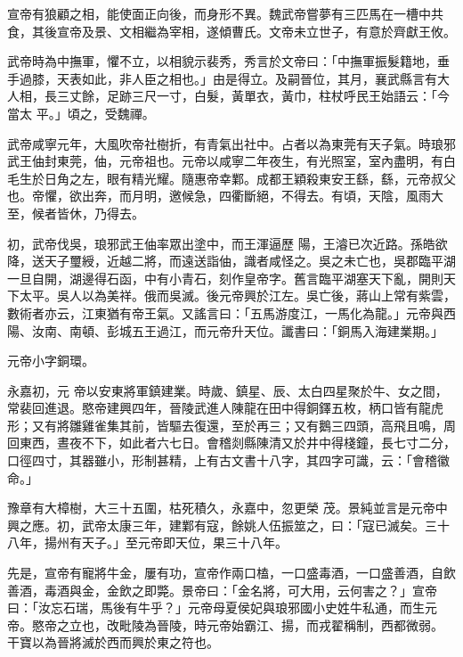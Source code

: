 \begin{pinyinscope}
 宣帝有狼顧之相，能使面正向後，而身形不異。魏武帝嘗夢有三匹馬在一槽中共食，其後宣帝及景、文相繼為宰相，遂傾曹氏。文帝未立世子，有意於齊獻王攸。



 武帝時為中撫軍，懼不立，以相貌示裴秀，秀言於文帝曰：「中撫軍振髮籍地，垂手過膝，天表如此，非人臣之相也。」由是得立。及嗣晉位，其月，襄武縣言有大人相，長三丈餘，足跡三尺一寸，白髮，黃單衣，黃巾，柱杖呼民王始語云：「今當太
 平。」頃之，受魏禪。



 武帝咸寧元年，大風吹帝社樹折，有青氣出社中。占者以為東莞有天子氣。時琅邪武王伷封東莞，伷，元帝祖也。元帝以咸寧二年夜生，有光照室，室內盡明，有白毛生於日角之左，眼有精光耀。隨惠帝幸鄴。成都王穎殺東安王繇，繇，元帝叔父也。帝懼，欲出奔，而月明，邀候急，四衢斷絕，不得去。有頃，天陰，風雨大至，候者皆休，乃得去。



 初，武帝伐吳，琅邪武王伷率眾出塗中，而王渾逼歷
 陽，王濬已次近路。孫皓欲降，送天子璽綬，近越二將，而遠送詣伷，識者咸怪之。吳之未亡也，吳郡臨平湖一旦自開，湖邊得石函，中有小青石，刻作皇帝字。舊言臨平湖塞天下亂，開則天下太平。吳人以為美祥。俄而吳滅。後元帝興於江左。吳亡後，蔣山上常有紫雲，數術者亦云，江東猶有帝王氣。又謠言曰：「五馬游度江，一馬化為龍。」元帝與西陽、汝南、南頓、彭城五王過江，而元帝升天位。讖書曰：「銅馬入海建業期。」



 元帝小字銅環。



 永嘉初，元
 帝以安東將軍鎮建業。時歲、鎮星、辰、太白四星聚於牛、女之間，常裴回進退。愍帝建興四年，晉陵武進人陳龍在田中得銅鐸五枚，柄口皆有龍虎形；又有將雛雞雀集其前，皆驅去復還，至於再三；又有鵝三四頭，高飛且鳴，周回東西，晝夜不下，如此者六七日。會稽剡縣陳清又於井中得棧鐘，長七寸二分，口徑四寸，其器雖小，形制甚精，上有古文書十八字，其四字可識，云：「會稽徽命。」



 豫章有大樟樹，大三十五圍，枯死積久，永嘉中，忽更榮
 茂。景純並言是元帝中興之應。初，武帝太康三年，建鄴有寇，餘姚人伍振筮之，曰：「寇已滅矣。三十八年，揚州有天子。」至元帝即天位，果三十八年。



 先是，宣帝有寵將牛金，屢有功，宣帝作兩口榼，一口盛毒酒，一口盛善酒，自飲善酒，毒酒與金，金飲之即斃。景帝曰：「金名將，可大用，云何害之？」宣帝曰：「汝忘石瑞，馬後有牛乎？」元帝母夏侯妃與琅邪國小史姓牛私通，而生元帝。愍帝之立也，改毗陵為晉陵，時元帝始霸江、揚，而戎翟稱制，西都微弱。
 干寶以為晉將滅於西而興於東之符也。




\end{pinyinscope}
